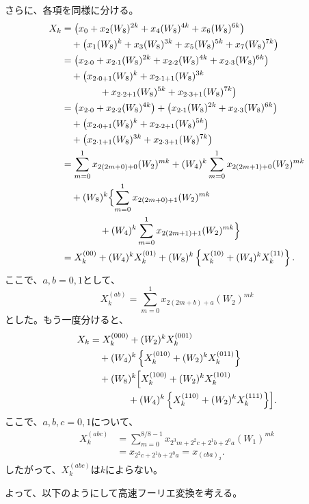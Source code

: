 \documentclass[a4j]{jarticle}
\begin{document}
さらに、各項を同様に分ける。
\[
  \begin{aligned}
    X_k
    &=\bigl(x_0+x_2(W_8)^{2k}+x_4(W_8)^{4k}+x_6(W_8)^{6k}\bigr)\\
    &\quad+\bigl(x_1(W_8)^k+x_3(W_8)^{3k}
      +x_5(W_8)^{5k}+x_7(W_8)^{7k}\bigr)\\
    &=\bigl(x_{2\cdot0}+x_{2\cdot1}(W_8)^{2k}
      +x_{2\cdot2}(W_8)^{4k}+x_{2\cdot3}(W_8)^{6k}\bigr)\\
    &\quad+\bigl(x_{2\cdot0+1}(W_8)^k+x_{2\cdot1+1}(W_8)^{3k}\\
    &\qquad\qquad+x_{2\cdot2+1}(W_8)^{5k}
      +x_{2\cdot3+1}(W_8)^{7k}\bigr)\\
    &=\bigl(x_{2\cdot0}+x_{2\cdot2}(W_8)^{4k}\bigr)
      +\bigl(x_{2\cdot1}(W_8)^{2k}+x_{2\cdot3}(W_8)^{6k}\bigr)\\
    &\quad+\bigl(x_{2\cdot0+1}(W_8)^k+x_{2\cdot2+1}(W_8)^{5k}\bigr)\\
    &\quad+\bigl(x_{2\cdot1+1}(W_8)^{3k}+x_{2\cdot3+1}(W_8)^{7k}\bigr)\\
    &=\sum_{m=0}^{1}x_{2(2m+0)+0}(W_2)^{mk}
      +(W_4)^k\sum_{m=0}^{1}x_{2(2m+1)+0}(W_2)^{mk}\\
    &\quad+(W_8)^k\Bigl\{
      \sum_{m=0}^{1}x_{2(2m+0)+1}(W_2)^{mk}\\
    &\qquad\qquad+(W_4)^k\sum_{m=0}^{1}x_{2(2m+1)+1}(W_2)^{mk}\Bigr\}\\
    &=X_k^{(00)}+(W_4)^kX_k^{(01)}
      +(W_8)^k\left\{X_k^{(10)}+(W_4)^kX_k^{(11)}\right\}.
  \end{aligned}
\]
ここで、$a,b=0,1$として、
\[
  X_k^{(ab)}=\sum_{m=0}^{1}x_{2(2m+b)+a}(W_2)^{mk}
\]
とした。もう一度分けると、
\[
  \begin{aligned}
    X_k
    &=X_k^{(000)}+(W_2)^kX_k^{(001)}\\
    &\quad+(W_4)^k\left\{X_k^{(010)}+(W_2)^kX_k^{(011)}\right\}\\
    &\quad+(W_8)^k\Bigl[
      X_k^{(100)}+(W_2)^kX_k^{(101)}\\
    &\qquad\qquad+(W_4)^k\left\{X_k^{(110)}+(W_2)^kX_k^{(111)}\right\}
      \Bigr].
  \end{aligned}
\]
ここで、$a,b,c=0,1$について、
\[
  \begin{aligned}
    X_k^{(abc)}
    &=\sum_{m=0}^{8/8-1}x_{2^3m+2^2c+2^1b+2^0a}(W_1)^{mk}\\
    &=x_{2^2c+2^1b+2^0a}=x_{(cba)_2}.
  \end{aligned}
\]
したがって、$X_k^{(abc)}$は$k$によらない。

よって、以下のようにして高速フーリエ変換を考える。
\end{document}
